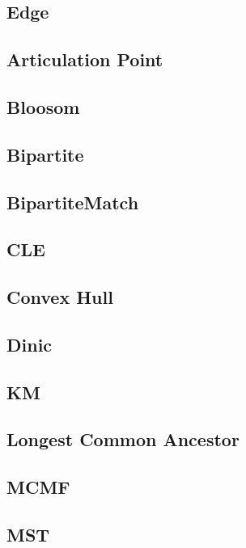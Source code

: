\subsection{Edge}

\subsection{Articulation Point}

\subsection{Bloosom}

\subsection{Bipartite}

\subsection{BipartiteMatch}

\subsection{CLE}

\subsection{Convex Hull}

\subsection{Dinic}

\subsection{KM}

\subsection{Longest Common Ancestor}

\subsection{MCMF}

\subsection{MST}

